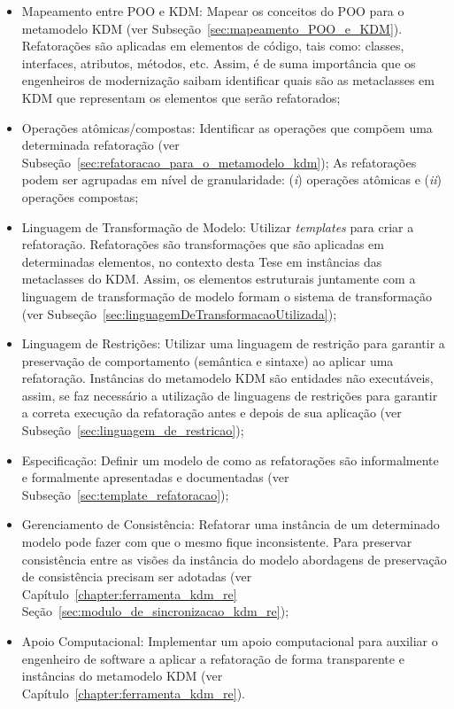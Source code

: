 \begin{itemize}
\item Mapeamento entre POO e KDM: Mapear os conceitos do POO para o metamodelo KDM (ver Subseção~\ref{sec:mapeamento_POO_e_KDM}). Refatorações são aplicadas em elementos de código, tais como: classes, interfaces, atributos, métodos, etc. Assim, é de suma importância que os engenheiros de modernização saibam identificar quais são as metaclasses em KDM que representam os elementos que serão refatorados;

\item Operações atômicas/compostas: Identificar as operações que compõem uma determinada refatoração (ver Subseção~\ref{sec:refatoracao_para_o_metamodelo_kdm}); As refatorações podem ser agrupadas em nível de granularidade: (\textit{i}) operações atômicas e (\textit{ii}) operações compostas;

\item Linguagem de Transformação de Modelo: Utilizar \textit{templates} para criar a refatoração. Refatorações são transformações que são aplicadas em determinadas elementos, no contexto desta Tese em instâncias das metaclasses do KDM. Assim, os elementos estruturais juntamente com a linguagem de transformação de modelo formam o sistema de transformação (ver Subseção~\ref{sec:linguagemDeTransformacaoUtilizada});

\item Linguagem de Restrições: Utilizar uma linguagem de restrição para garantir a preservação de comportamento (semântica e sintaxe) ao aplicar uma refatoração. Instâncias do metamodelo KDM são entidades não executáveis, assim, se faz necessário a utilização de linguagens de restrições para garantir a correta execução da refatoração antes e depois de sua aplicação (ver Subseção~\ref{sec:linguagem_de_restricao});

\item Especificação: Definir um modelo de como as refatorações são informalmente e formalmente apresentadas e documentadas (ver Subseção~\ref{sec:template_refatoracao});

\item Gerenciamento de Consistência: Refatorar uma instância de um determinado modelo pode fazer com que o mesmo fique inconsistente. Para preservar consistência entre as visões da instância do modelo abordagens de preservação de consistência precisam ser adotadas (ver Capítulo~\ref{chapter:ferramenta_kdm_re} Seção~\ref{sec:modulo_de_sincronizacao_kdm_re});

\item Apoio Computacional: Implementar um apoio computacional para auxiliar o engenheiro de software a aplicar a refatoração de forma transparente e instâncias do metamodelo KDM (ver Capítulo~\ref{chapter:ferramenta_kdm_re}).
\end{itemize}

